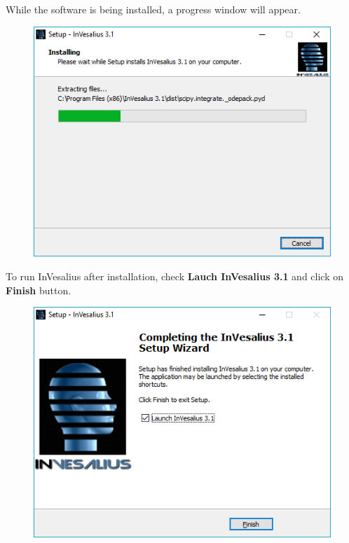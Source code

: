\hspace{.2cm}

While the software is being installed, a progress window will appear.

\begin{figure}[!htb]
\centering
\includegraphics[scale=0.7]{../user_guide_figures/invesalius_screen/installation_progress_en.png}
\end{figure}

\newpage

To run InVesalius after installation, check \textbf{Lauch InVesalius 3.1} and click on \textbf{Finish} button.

\begin{figure}[!htb]
\centering
\includegraphics[scale=0.7]{../user_guide_figures/invesalius_screen/installation_finish_en.png}
\end{figure}

